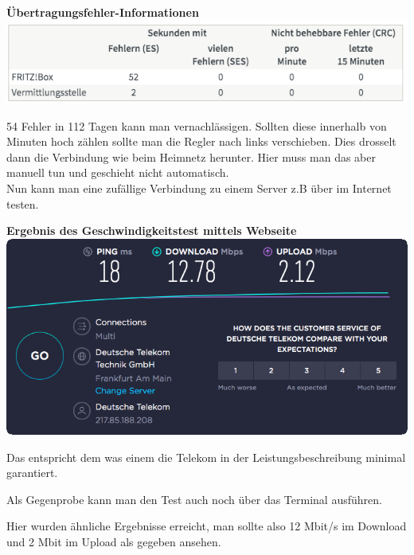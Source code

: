 {\vspace{-0.1cm}}
\begin{center}
  \textbf{Übertragungsfehler-Informationen}\\
  \includegraphics[scale=0.50]{./pictures/leitungsinformationFehler.png}
\end{center}

54 Fehler in 112 Tagen kann man vernachlässigen. Sollten diese innerhalb von Minuten hoch zählen sollte man die Regler nach links verschieben.
Dies drosselt dann die Verbindung wie beim Heimnetz herunter. Hier muss man das aber manuell tun und geschieht nicht automatisch.\\

Nun kann man eine zufällige Verbindung zu einem Server z.B über  im Internet testen.
\begin{center}
  \textbf{Ergebnis des Geschwindigkeitstest mittels Webseite} \\
  {\vspace{0.3cm}}
  \includegraphics[scale=0.45]{./pictures/speedtestWeb.png}
\end{center}

Das entspricht dem was einem die Telekom in der Leistungsbeschreibung minimal garantiert.

Als Gegenprobe kann man den Test auch noch über das Terminal ausführen. \\


Hier wurden ähnliche Ergebnisse erreicht, man sollte also 12 Mbit/s im Download und 2 Mbit im Upload als gegeben ansehen.



